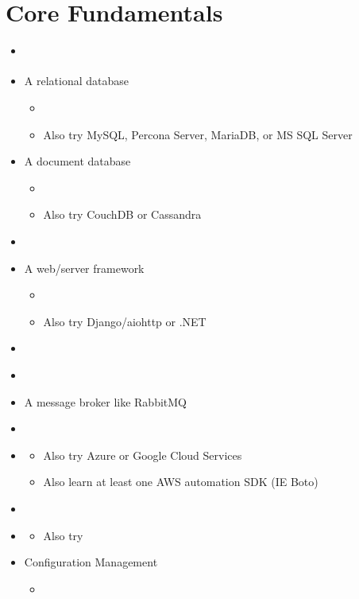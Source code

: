 \documentclass[12pt]{article}
\begin{document}
\section{Core Fundamentals}
\begin{itemize}
\item \autocite{nemeth2017unix}
\item A relational database
  \begin{itemize}
  \item \autocite{juba2015learning}
  \item Also try MySQL, Percona Server, MariaDB, or MS SQL Server
  \end{itemize}
\item A document database
  \begin{itemize}
  \item \autocite{chodorow2010mongodb}
  \item Also try CouchDB or Cassandra
  \end{itemize}
\item \autocite{carlson2013redis}
\item A web/server framework
  \begin{itemize}
  \item \autocite{walls2018spring}
  \item Also try Django/aiohttp or .NET
  \end{itemize}
\item \autocite{chacon2014git}
\item \autocite{smart2011jenkins}
\item A message broker like RabbitMQ
\item \autocite{josuttis2007soa}
\item \autocite{wittig2018aws}
  \begin{itemize}
  \item Also try Azure or Google Cloud Services
  \item Also learn at least one AWS automation SDK (IE Boto)
  \end{itemize}
\item \autocite{nickoloff2016docker}
\item \autocite{burns2017kubernetes}
  \begin{itemize}
  \item Also try \autocite{hightowerkubernetes}
  \end{itemize}
\item Configuration Management
  \begin{itemize}
  \item \autocite{geerling2015ansible}

\end{itemize}
\end{itemize}
\end{document}
